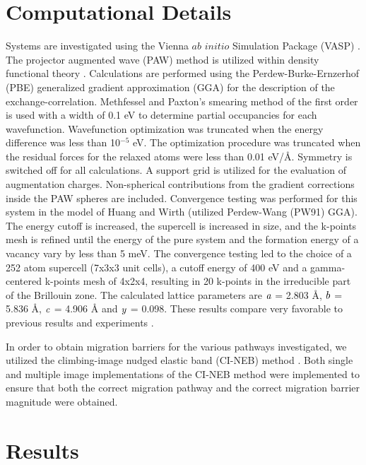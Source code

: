 \documentclass[review]{elsarticle}
\begin{document}
\section{Computational Details}
Systems are investigated using the Vienna $\textit{ab initio}$ Simulation Package (VASP) \cite{vasp1, vasp2, vasp3, vasp4}.  The projector augmented wave (PAW) method \cite{paw1, paw2} is utilized within density functional theory \cite{dft1, dft2}.  Calculations are performed using the Perdew-Burke-Ernzerhof (PBE) \cite{pbe1, pbe2} generalized gradient approximation (GGA) for the description of the exchange-correlation.  Methfessel and Paxton's smearing method \cite{methfessel} of the first order is used with a width of 0.1 eV to determine partial occupancies for each wavefunction.  Wavefunction optimization was truncated when the energy difference was less than 10$^{-5}$ eV.  The optimization procedure was truncated when the residual forces for the relaxed atoms were less than 0.01 eV/{\AA}.  Symmetry is switched off for all calculations.  A support grid is utilized for the evaluation of augmentation charges.  Non-spherical contributions from the gradient corrections inside the PAW spheres are included.  Convergence testing was performed for this system in the model of Huang and Wirth \cite{wirth2011} (utilized Perdew-Wang (PW91) \cite{pw91, pw91b} GGA).   The energy cutoff is increased, the supercell is increased in size, and the k-points mesh is refined until the energy of the pure system and the formation energy of a vacancy vary by less than 5 meV.  The convergence testing led to the choice of a 252 atom supercell (7x3x3 unit cells), a cutoff energy of 400 eV and a gamma-centered k-points mesh of 4x2x4, resulting in 20 k-points in the irreducible part of the Brillouin zone. The calculated lattice parameters are $\it{a}$ = 2.803 {\AA}, $\it{b}$ = 5.836 {\AA}, $\it{c}$ = 4.906 {\AA} and $\it{y}$ = 0.098.  These results compare very favorable to previous results \cite{wirth2011, soderlind2002, taylor2008}  and experiments \cite{barrett1963}.  

In order to obtain migration barriers for the various pathways investigated, we utilized the climbing-image nudged elastic band (CI-NEB) method \cite{neb1}.  Both single and multiple image implementations of the CI-NEB method were implemented to ensure that both the correct migration pathway and the correct migration barrier magnitude were obtained. 

\section{Results}
\end{document}

